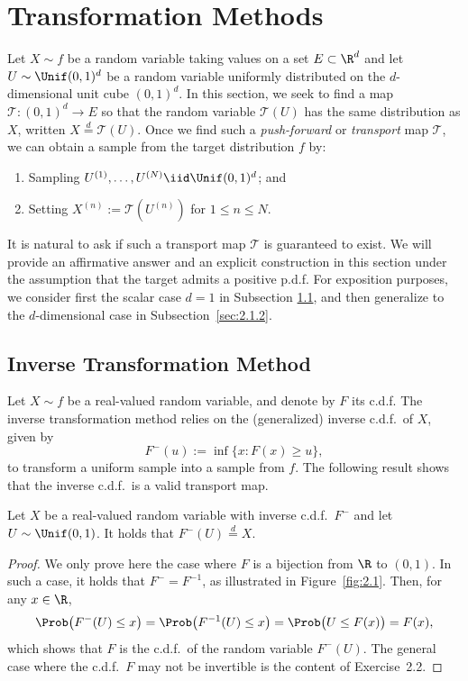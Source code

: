 \section{Transformation Methods}
\label{sec:2.1}

Let $X \sim f$ be a random variable taking values on a set $E \subset \R^d$ and let $U \sim \Unif(0,1)^d$ be a
random variable uniformly distributed on the $d$-dimensional unit cube $(0,1)^d$. In this section, we
seek to find a map $\mathcal{T} : (0,1)^d \to E$ so that the random variable $\mathcal{T}(U)$ has the same distribution
as $X$, written $X \overset{d}{=} \mathcal{T}(U)$. Once we find such a \textit{push-forward} or \textit{transport} map $\mathcal{T}$, we can obtain
a sample from the target distribution $f$ by:
\begin{enumerate}
  \item Sampling $U^{(1)}, \ldots, U^{(N)} \iid \Unif(0,1)^d$; and
  \item Setting $X^{(n)} := \mathcal{T}(U^{(n)})$ for $1 \le n \le N$.
\end{enumerate}

It is natural to ask if such a transport map $\mathcal{T}$ is guaranteed to exist. We will provide an affirmative
answer and an explicit construction in this section under the assumption that the target admits
a positive p.d.f. For exposition purposes, we consider first the scalar case $d = 1$ in Subsection
\ref{sec:2.1.1}, and then generalize to the $d$-dimensional case in Subsection~\ref{sec:2.1.2}.

\subsection{Inverse Transformation Method}
\label{sec:2.1.1}

Let $X \sim f$ be a real-valued random variable, and denote by $F$ its c.d.f. The inverse transformation
method relies on the (generalized) inverse c.d.f.\ of $X$, given by
\[
  F^-(u) := \inf\{x : F(x) \ge u\},
\]
to transform a uniform sample into a sample from $f$. The following result shows that the inverse
c.d.f.\ is a valid transport map.

\begin{theorem}
\label{thm:2.1}
Let $X$ be a real-valued random variable with inverse c.d.f.\ $F^-$ and let $U \sim \Unif(0,1)$. It holds that $F^-(U) \overset{d}{=} X$.
\end{theorem}

\begin{proof}
We only prove here the case where $F$ is a bijection from $\R$ to $(0,1)$. In such a case, it
holds that $F^- = F^{-1}$, as illustrated in Figure~\ref{fig:2.1}. Then, for any $x \in \R$,
\[
  \Prob\bigl(F^-(U) \le x\bigr) = \Prob\bigl(F^{-1}(U) \le x\bigr) = \Prob\bigl(U \le F(x)\bigr) = F(x),
\]
which shows that $F$ is the c.d.f.\ of the random variable $F^-(U)$. The general case where the c.d.f.\
$F$ may not be invertible is the content of Exercise~2.2.
\end{proof}


